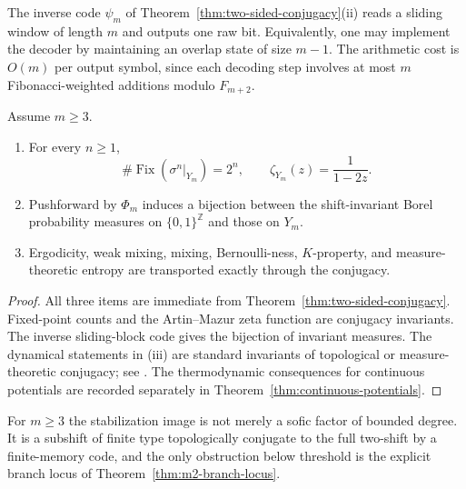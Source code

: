 \begin{remark}\label{rem:decoder-complexity}
The inverse code $\psi_m$ of Theorem~\ref{thm:two-sided-conjugacy}(ii) reads a sliding window of length $m$ and outputs one raw bit. Equivalently, one may implement the decoder by maintaining an overlap state of size $m-1$. The arithmetic cost is $O(m)$ per output symbol, since each decoding step involves at most $m$ Fibonacci-weighted additions modulo $F_{m+2}$.
\end{remark}

\begin{proposition}\label{prop:conjugacy-consequences}
Assume $m\ge 3$.
\begin{enumerate}[label=(\roman*),leftmargin=*,itemsep=2pt]
  \item For every $n\ge 1$,
  \[
  \#\operatorname{Fix}(\sigma^n|_{Y_m})=2^n,
  \qquad
  \zeta_{Y_m}(z)=\frac{1}{1-2z}.
  \]
  \item Pushforward by $\Phi_m$ induces a bijection between the shift-invariant Borel probability measures on $\{0,1\}^{\mathbb Z}$ and those on $Y_m$.
  \item Ergodicity, weak mixing, mixing, Bernoulli-ness, $K$-property, and measure-theoretic entropy are transported exactly through the conjugacy.
\end{enumerate}
\end{proposition}

\begin{proof}
All three items are immediate from Theorem~\ref{thm:two-sided-conjugacy}. Fixed-point counts and the Artin--Mazur zeta function are conjugacy invariants. The inverse sliding-block code gives the bijection of invariant measures. The dynamical statements in (iii) are standard invariants of topological or measure-theoretic conjugacy; see \cite{Walters1982}. The thermodynamic consequences for continuous potentials are recorded separately in Theorem~\ref{thm:continuous-potentials}.
\end{proof}

\begin{remark}\label{rem:exact-recoding}
For $m\ge 3$ the stabilization image is not merely a sofic factor of bounded degree. It is a subshift of finite type topologically conjugate to the full two-shift by a finite-memory code, and the only obstruction below threshold is the explicit branch locus of Theorem~\ref{thm:m2-branch-locus}.
\end{remark}


